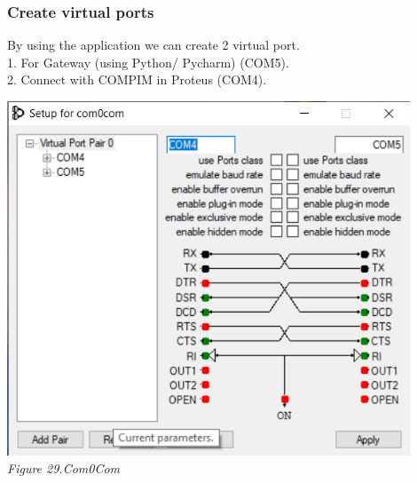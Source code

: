 \documentclass[a4paper]{article}
\begin{document}
\subsubsection{Create virtual ports}
By using the application we can create 2 virtual port. \\
    1. For Gateway (using Python/ Pycharm) (COM5). \\
    2. Connect with COMPIM in Proteus (COM4). \\
\begin{center}
    \includegraphics[width=12cm]{pictures/Com0com.png}\\
    \textit{Figure 29.Com0Com}\\
\end{center}
\end{document}
